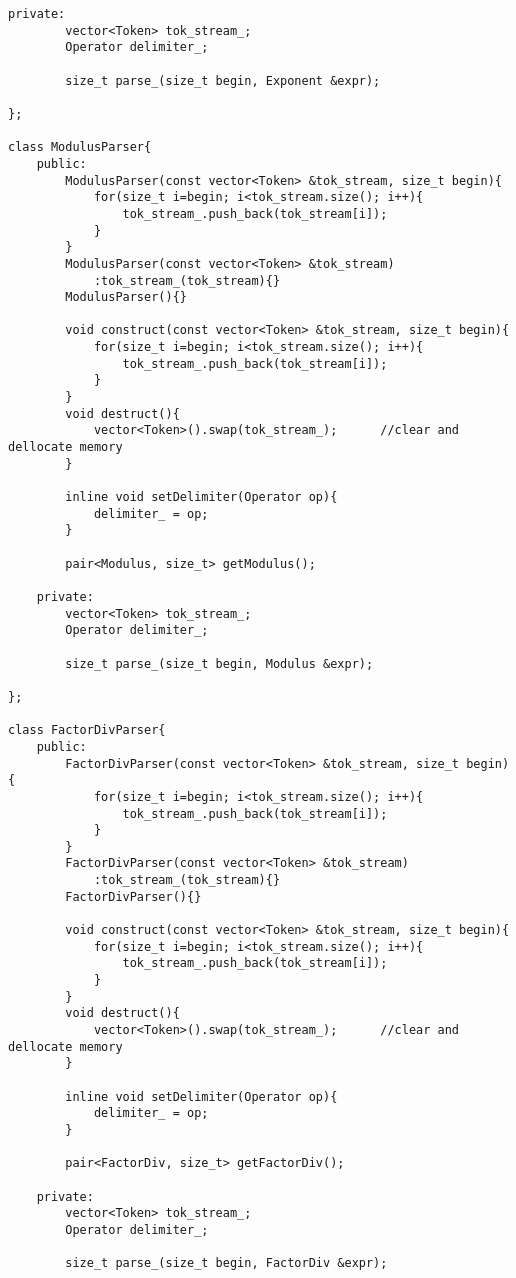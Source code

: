 \documentclass[pdftex,12pt,letterpaper,notitlepage,twoside]{article}
\begin{document}
\begin{lstlisting}[frame=single,caption={C program for testing}]
    private:
        vector<Token> tok_stream_;
        Operator delimiter_;

        size_t parse_(size_t begin, Exponent &expr);

};

class ModulusParser{
    public:
        ModulusParser(const vector<Token> &tok_stream, size_t begin){
            for(size_t i=begin; i<tok_stream.size(); i++){
                tok_stream_.push_back(tok_stream[i]);
            }
        }
        ModulusParser(const vector<Token> &tok_stream)
            :tok_stream_(tok_stream){}
        ModulusParser(){}

        void construct(const vector<Token> &tok_stream, size_t begin){
            for(size_t i=begin; i<tok_stream.size(); i++){
                tok_stream_.push_back(tok_stream[i]);
            }
        }
        void destruct(){
            vector<Token>().swap(tok_stream_);      //clear and dellocate memory
        }

        inline void setDelimiter(Operator op){
            delimiter_ = op;
        }

        pair<Modulus, size_t> getModulus();

    private:
        vector<Token> tok_stream_;
        Operator delimiter_;

        size_t parse_(size_t begin, Modulus &expr);

};

class FactorDivParser{
    public:
        FactorDivParser(const vector<Token> &tok_stream, size_t begin){
            for(size_t i=begin; i<tok_stream.size(); i++){
                tok_stream_.push_back(tok_stream[i]);
            }
        }
        FactorDivParser(const vector<Token> &tok_stream)
            :tok_stream_(tok_stream){}
        FactorDivParser(){}

        void construct(const vector<Token> &tok_stream, size_t begin){
            for(size_t i=begin; i<tok_stream.size(); i++){
                tok_stream_.push_back(tok_stream[i]);
            }
        }
        void destruct(){
            vector<Token>().swap(tok_stream_);      //clear and dellocate memory
        }

        inline void setDelimiter(Operator op){
            delimiter_ = op;
        }

        pair<FactorDiv, size_t> getFactorDiv();

    private:
        vector<Token> tok_stream_;
        Operator delimiter_;

        size_t parse_(size_t begin, FactorDiv &expr);


\end{lstlisting}
\end{document}
